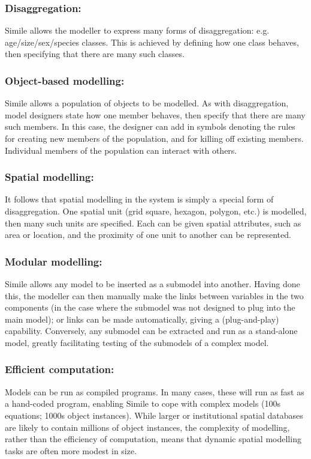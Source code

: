 	\subsubsection{Disaggregation:}
Simile allows the modeller to express many forms of disaggregation: e.g. age/size/sex/species classes. This is achieved by defining how one class behaves, then specifying that there are many such classes.
	\subsubsection{Object-based modelling:}
Simile allows a population of objects to be modelled. As with disaggregation, model designers state how one member behaves, then specify that there are many such members. In this case, the designer can add in symbols denoting the rules for creating new members of the population, and for killing off existing members. Individual members of the population can interact with others.
	\subsubsection{Spatial modelling:}
It follows that spatial modelling in the system is simply a special form of disaggregation. One spatial unit (grid square, hexagon, polygon, etc.) is modelled, then many such units are specified. Each can be given spatial attributes, such as area or location, and the proximity of one unit to another can be represented.
	\subsubsection{Modular modelling:}
Simile allows any model to be inserted as a submodel into another. Having done this, the modeller can then manually make the links between variables in the two components (in the case where the submodel was not designed to plug into the main model); or links can be made automatically, giving a (plug-and-play) capability. Conversely, any submodel can be extracted and run as a stand-alone model, greatly facilitating testing of the submodels of a complex model.
	\subsubsection{Efficient computation:}
Models can be run as compiled programs. In many cases, these will run as fast as a hand-coded program, enabling Simile to cope with complex models (100s equations; 1000s object instances). While larger or institutional spatial databases are likely to contain millions of object instances, the complexity of modelling, rather than the efficiency of computation, means that dynamic spatial modelling tasks are often more modest in size.
